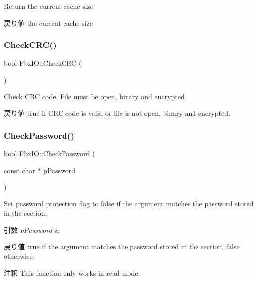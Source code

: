 Return the current cache size \begin{DoxyReturn}{戻り値}
the current cache size 
\end{DoxyReturn}
\mbox{\label{class_fbx_i_o_a736496aefdcad9fb0ac5362ae4c3f54e}} 
\subsubsection{\texorpdfstring{Check\+C\+R\+C()}{CheckCRC()}}
{\footnotesize\ttfamily bool Fbx\+I\+O\+::\+Check\+C\+RC (\begin{DoxyParamCaption}{ }\end{DoxyParamCaption})}

Check C\+RC code. File must be open, binary and encrypted. \begin{DoxyReturn}{戻り値}
{\ttfamily true} if C\+RC code is valid or file is not open, binary and encrypted. 
\end{DoxyReturn}
\mbox{\label{class_fbx_i_o_aef25f0c71cf2a40239c732bc4226b69a}} 
\subsubsection{\texorpdfstring{Check\+Password()}{CheckPassword()}}
{\footnotesize\ttfamily bool Fbx\+I\+O\+::\+Check\+Password (\begin{DoxyParamCaption}\item[{const char $\ast$}]{p\+Password }\end{DoxyParamCaption})}

Set password protection flag to {\ttfamily false} if the argument matches the password stored in the section. 
\begin{DoxyParams}{引数}
{\em p\+Password} & \\
\hline
\end{DoxyParams}
\begin{DoxyReturn}{戻り値}
{\ttfamily true} if the argument matches the password stored in the section, {\ttfamily false} otherwise. 
\end{DoxyReturn}
\begin{DoxyRemark}{注釈}
This function only works in read mode. 
\end{DoxyRemark}
\mbox{\label{class_fbx_i_o_a08824b000f12973ce914f100718f40b4}} 
